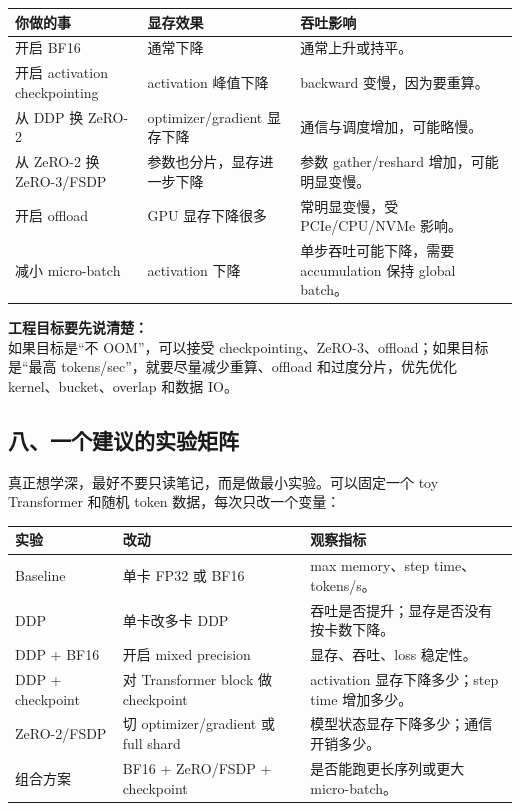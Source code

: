 \begin{center}
{\small
\begin{tabular}{p{3.6cm}p{4.7cm}p{4.2cm}}
\hline
\textbf{你做的事} & \textbf{显存效果} & \textbf{吞吐影响} \\
\hline
开启 BF16 & 通常下降 & 通常上升或持平。 \\
开启 activation checkpointing & activation 峰值下降 & backward 变慢，因为要重算。 \\
从 DDP 换 ZeRO-2 & optimizer/gradient 显存下降 & 通信与调度增加，可能略慢。 \\
从 ZeRO-2 换 ZeRO-3/FSDP & 参数也分片，显存进一步下降 & 参数 gather/reshard 增加，可能明显变慢。 \\
开启 offload & GPU 显存下降很多 & 常明显变慢，受 PCIe/CPU/NVMe 影响。 \\
减小 micro-batch & activation 下降 & 单步吞吐可能下降，需要 accumulation 保持 global batch。 \\
\hline
\end{tabular}
}
\end{center}

\begin{warnbox}
\textbf{工程目标要先说清楚：}\\
如果目标是“不 OOM”，可以接受 checkpointing、ZeRO-3、offload；如果目标是“最高 tokens/sec”，就要尽量减少重算、offload 和过度分片，优先优化 kernel、bucket、overlap 和数据 IO。
\end{warnbox}

\subsection{八、一个建议的实验矩阵}

真正想学深，最好不要只读笔记，而是做最小实验。可以固定一个 toy Transformer 和随机 token 数据，每次只改一个变量：

\begin{center}
{\small
\begin{tabular}{p{3cm}p{4.7cm}p{5cm}}
\hline
\textbf{实验} & \textbf{改动} & \textbf{观察指标} \\
\hline
Baseline & 单卡 FP32 或 BF16 & max memory、step time、tokens/s。 \\
DDP & 单卡改多卡 DDP & 吞吐是否提升；显存是否没有按卡数下降。 \\
DDP + BF16 & 开启 mixed precision & 显存、吞吐、loss 稳定性。 \\
DDP + checkpoint & 对 Transformer block 做 checkpoint & activation 显存下降多少；step time 增加多少。 \\
ZeRO-2/FSDP & 切 optimizer/gradient 或 full shard & 模型状态显存下降多少；通信开销多少。 \\
组合方案 & BF16 + ZeRO/FSDP + checkpoint & 是否能跑更长序列或更大 micro-batch。 \\
\hline
\end{tabular}
}
\end{center}

